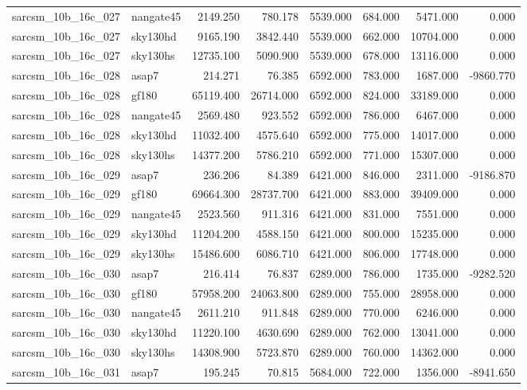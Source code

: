 \begin{tabular}{llrrrrrr}
sarcsm\_10b\_16c\_027 & nangate45 & 2149.250 & 780.178 & 5539.000 & 684.000 & 5471.000 & 0.000 \\
sarcsm\_10b\_16c\_027 & sky130hd & 9165.190 & 3842.440 & 5539.000 & 662.000 & 10704.000 & 0.000 \\
sarcsm\_10b\_16c\_027 & sky130hs & 12735.100 & 5090.900 & 5539.000 & 678.000 & 13116.000 & 0.000 \\
sarcsm\_10b\_16c\_028 & asap7 & 214.271 & 76.385 & 6592.000 & 783.000 & 1687.000 & -9860.770 \\
sarcsm\_10b\_16c\_028 & gf180 & 65119.400 & 26714.000 & 6592.000 & 824.000 & 33189.000 & 0.000 \\
sarcsm\_10b\_16c\_028 & nangate45 & 2569.480 & 923.552 & 6592.000 & 786.000 & 6467.000 & 0.000 \\
sarcsm\_10b\_16c\_028 & sky130hd & 11032.400 & 4575.640 & 6592.000 & 775.000 & 14017.000 & 0.000 \\
sarcsm\_10b\_16c\_028 & sky130hs & 14377.200 & 5786.210 & 6592.000 & 771.000 & 15307.000 & 0.000 \\
sarcsm\_10b\_16c\_029 & asap7 & 236.206 & 84.389 & 6421.000 & 846.000 & 2311.000 & -9186.870 \\
sarcsm\_10b\_16c\_029 & gf180 & 69664.300 & 28737.700 & 6421.000 & 883.000 & 39409.000 & 0.000 \\
sarcsm\_10b\_16c\_029 & nangate45 & 2523.560 & 911.316 & 6421.000 & 831.000 & 7551.000 & 0.000 \\
sarcsm\_10b\_16c\_029 & sky130hd & 11204.200 & 4588.150 & 6421.000 & 800.000 & 15235.000 & 0.000 \\
sarcsm\_10b\_16c\_029 & sky130hs & 15486.600 & 6086.710 & 6421.000 & 806.000 & 17748.000 & 0.000 \\
sarcsm\_10b\_16c\_030 & asap7 & 216.414 & 76.837 & 6289.000 & 786.000 & 1735.000 & -9282.520 \\
sarcsm\_10b\_16c\_030 & gf180 & 57958.200 & 24063.800 & 6289.000 & 755.000 & 28958.000 & 0.000 \\
sarcsm\_10b\_16c\_030 & nangate45 & 2611.210 & 911.848 & 6289.000 & 770.000 & 6246.000 & 0.000 \\
sarcsm\_10b\_16c\_030 & sky130hd & 11220.100 & 4630.690 & 6289.000 & 762.000 & 13041.000 & 0.000 \\
sarcsm\_10b\_16c\_030 & sky130hs & 14308.900 & 5723.870 & 6289.000 & 760.000 & 14362.000 & 0.000 \\
sarcsm\_10b\_16c\_031 & asap7 & 195.245 & 70.815 & 5684.000 & 722.000 & 1356.000 & -8941.650 \\

\end{tabular}
